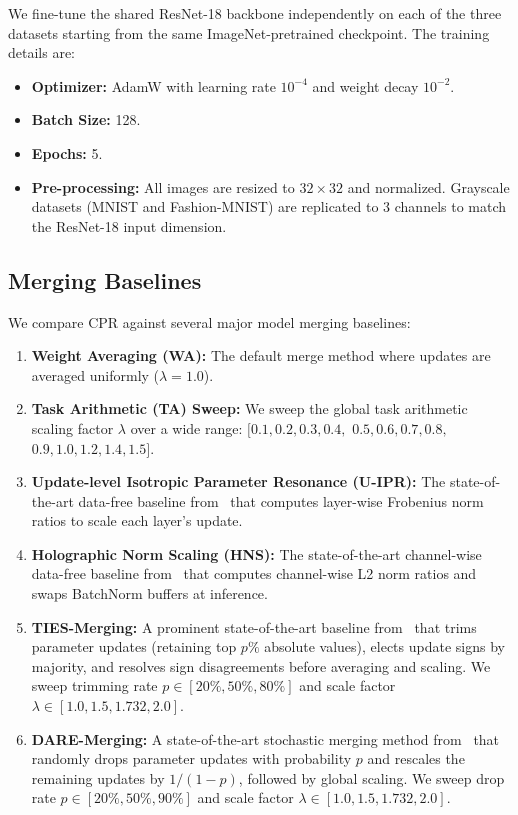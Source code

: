 \documentclass{article}
\theoremstyle{plain}
\theoremstyle{definition}
\theoremstyle{remark}
\begin{document}
We fine-tune the shared ResNet-18 backbone independently on each of the three datasets starting from the same ImageNet-pretrained checkpoint. The training details are:
\begin{itemize}
\item \textbf{Optimizer:} AdamW with learning rate $10^{-4}$ and weight decay $10^{-2}$.
\item \textbf{Batch Size:} 128.
\item \textbf{Epochs:} 5.
\item \textbf{Pre-processing:} All images are resized to $32 \times 32$ and normalized. Grayscale datasets (MNIST and Fashion-MNIST) are replicated to 3 channels to match the ResNet-18 input dimension.
\end{itemize}

\subsection{Merging Baselines}
We compare CPR against several major model merging baselines:
\begin{enumerate}
\item \textbf{Weight Averaging (WA):} The default merge method where updates are averaged uniformly ($\lambda=1.0$).
\item \textbf{Task Arithmetic (TA) Sweep:} We sweep the global task arithmetic scaling factor $\lambda$ over a wide range: $[0.1, 0.2, 0.3, 0.4,$ $0.5, 0.6, 0.7, 0.8,$ $0.9, 1.0, 1.2, 1.4, 1.5]$.
\item \textbf{Update-level Isotropic Parameter Resonance (U-IPR):} The state-of-the-art data-free baseline from~\cite{ipr2025} that computes layer-wise Frobenius norm ratios to scale each layer's update.
\item \textbf{Holographic Norm Scaling (HNS):} The state-of-the-art channel-wise data-free baseline from~\cite{hns2025} that computes channel-wise L2 norm ratios and swaps BatchNorm buffers at inference.
\item \textbf{TIES-Merging:} A prominent state-of-the-art baseline from~\cite{ties2023} that trims parameter updates (retaining top $p\%$ absolute values), elects update signs by majority, and resolves sign disagreements before averaging and scaling. We sweep trimming rate $p \in [20\%, 50\%, 80\%]$ and scale factor $\lambda \in [1.0, 1.5, 1.732, 2.0]$.
\item \textbf{DARE-Merging:} A state-of-the-art stochastic merging method from~\cite{dare2024} that randomly drops parameter updates with probability $p$ and rescales the remaining updates by $1/(1-p)$, followed by global scaling. We sweep drop rate $p \in [20\%, 50\%, 90\%]$ and scale factor $\lambda \in [1.0, 1.5, 1.732, 2.0]$.
\end{enumerate}
\end{document}
